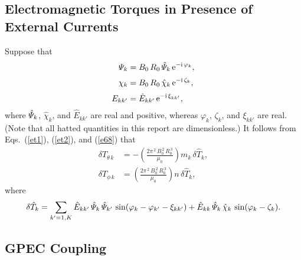 \documentclass[12pt]{article}
\begin{document}
\subsection{Electromagnetic Torques in Presence of External Currents}
Suppose that
\begin{align}
{\mit\Psi}_k &= B_0\,R_0\,\hat{\mit\Psi}_k\,{\rm e}^{-{\rm i}\,\varphi_k},\\[0.5ex]
\chi_k &= B_0\,R_0\,\hat{\chi}_{k}\,{\rm e}^{-{\rm i}\,\zeta_k},\\[0.5ex]
E_{kk'} &= \hat{E}_{kk'}\,{\rm e}^{-{\rm i}\,\xi_{kk'}},
\end{align}
where $\hat{\mit\Psi}_k$, $\hat{\chi}_{k}$, and $\hat{E}_{kk'}$
are real and positive, whereas $\varphi_k$, $\zeta_k$, and
$\xi_{kk'}$ are real. 
(Note that all hatted quantities in this report are dimensionless.)
It follows from Eqs.~(\ref{et1}), (\ref{et2}), and (\ref{e68})
that
\begin{align}
\delta T_{\theta\,k} &=-\left(\frac{2\pi^{\,2}\,B_0^{\,2}\,R_0^{\,3}}{\mu_0}\right)m_k\,\delta \hat{T}_k,\\[0.5ex]
\delta T_{\phi\,k}&= \left(\frac{2\pi^{\,2}\,B_0^{\,2}\,R_0^{\,3}}{\mu_0}\right)n\,\delta \hat{T}_k,
\end{align}
where
\begin{equation}
\delta \hat{T}_k= \sum_{k'=1,K}\hat{E}_{kk'}\,\hat{\mit\Psi}_k\,\hat{\mit\Psi}_{k'}\,\sin(\varphi_k-\varphi_{k'}-\xi_{kk'}) + \hat{E}_{kk}\,\hat{\mit\Psi}_k\,\hat{\chi}_{k}\,\sin(\varphi_k-\zeta_k).
\end{equation}

\subsection{GPEC Coupling}
\end{document}
